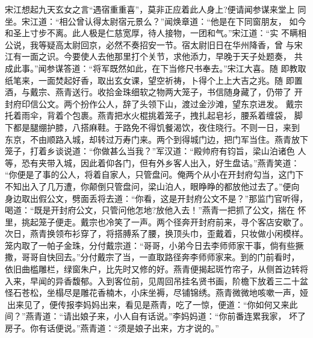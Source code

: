 宋江想起九天玄女之言“遇宿重重喜”，莫非正应着此人身上?便请闻参谋来堂上
同坐。宋江道：“相公曾认得太尉宿元景么？”闻焕章道：“他是在下同窗朋友，
如今和圣上寸步不离。此人极是仁慈宽厚，待人接物，一团和气。”宋江道：“实
不瞒相公说，我等疑高太尉回京，必然不奏招安一节。宿太尉旧日在华州降香，曾
与宋江有一面之识。今要使人去他那里打个关节，求他添力，早晚于天子处题奏，
共成此事。”闻参谋答道：“将军既然如此，在下当修尺书奉去。”宋江大喜。随
即教取纸笔来，一面焚起好香，取出玄女课，望空祈祷，卜得个上上大吉之兆。随
即置酒，与戴宗、燕青送行。收拾金珠细软之物两大笼子，书信随身藏了，仍带了
开封府印信公文。两个扮作公人，辞了头领下山，渡过金沙滩，望东京进发。
戴宗托着雨伞，背着个包裹。燕青把水火棍挑着笼子，拽扎起皂衫，腰系着缠袋，
脚下都是腿绷护膝，八搭麻鞋。于路免不得饥餐渴饮，夜住晓行。不则一日，来到
东京，不由顺路入城，却转过万寿门来。两个到得城门边，把门军当住。燕青放下
笼子，打着乡谈说道：“你做甚么当我？”军汉道：“殿帅府有钧旨，梁山泊诸色
人等，恐有夹带入城，因此着仰各门，但有外乡客人出入，好生盘诘。”燕青笑道：
“你便是了事的公人，将着自家人，只管盘问。俺两个从小在开封府勾当，这门下
不知出入了几万遭，你颠倒只管盘问，梁山泊人，眼睁睁的都放他过去了。”便向
身边取出假公文，劈面丢将去道：“你看，这是开封府公文不是？”那监门官听得，
喝道：“既是开封府公文，只管问他怎地?放他入去！”燕青一把抓了公文，揣在
怀里，挑起笼子便走。戴宗也冷笑了一声。两个径奔开封府前来，寻个客店安歇了。
次日，燕青换领布衫穿了，将搭膊系了腰，换顶头巾，歪戴着，只妆做小闲模样。
笼内取了一帕子金珠，分付戴宗道：“哥哥，小弟今日去李师师家干事，倘有些撅
撒，哥哥自快回去。”分付戴宗了当，一直取路径奔李师师家来。到的门前看时，
依旧曲槛雕栏，绿窗朱户，比先时又修的好。燕青便揭起斑竹帘子，从侧首边转将
入来，早闻的异香馥郁。入到客位前，见周回吊挂名贤书画，阶檐下放着三二十盆
怪石苍松，坐榻尽是雕花香楠木，小床坐褥，尽铺锦绣。燕青微微地咳嗽一声，娅
出来见了，便传报李妈妈出来，看见是燕青，吃了一惊，便道：“你如何又来此
间？”燕青道：“请出娘子来，小人自有话说。”李妈妈道：“你前番连累我家，
坏了房子。你有话便说。”燕青道：“须是娘子出来，方才说的。”

